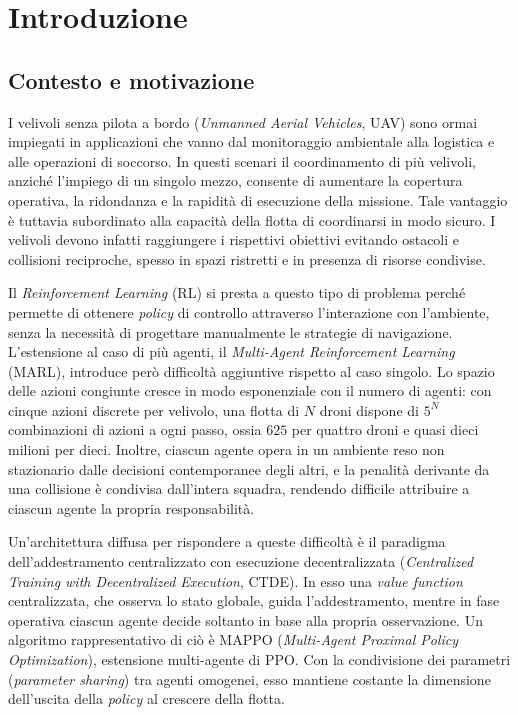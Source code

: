\documentclass[12pt,a4paper,twoside]{report}
\newcommand{\paginabianca}{\clearpage\null\thispagestyle{empty}\clearpage}
\begin{document}

\paginabianca

\tableofcontents
\clearpage

\chapter{Introduzione}
\label{chap:introduzione}

\section{Contesto e motivazione}
\label{sec:contesto_motivazione}

I velivoli senza pilota a bordo (\emph{Unmanned Aerial Vehicles}, UAV) sono ormai impiegati in applicazioni che vanno dal monitoraggio ambientale alla logistica e alle operazioni di soccorso. In questi scenari il coordinamento di più velivoli, anziché l'impiego di un singolo mezzo, consente di aumentare la copertura operativa, la ridondanza e la rapidità di esecuzione della missione. Tale vantaggio è tuttavia subordinato alla capacità della flotta di coordinarsi in modo sicuro. I velivoli devono infatti raggiungere i rispettivi obiettivi evitando ostacoli e collisioni reciproche, spesso in spazi ristretti e in presenza di risorse condivise.

Il \emph{Reinforcement Learning} (RL) si presta a questo tipo di problema perché permette di ottenere \emph{policy} di controllo attraverso l'interazione con l'ambiente, senza la necessità di progettare manualmente le strategie di navigazione. L'estensione al caso di più agenti, il \emph{Multi-Agent Reinforcement Learning} (MARL), introduce però difficoltà aggiuntive rispetto al caso singolo. Lo spazio delle azioni congiunte cresce in modo esponenziale con il numero di agenti: con cinque azioni discrete per velivolo, una flotta di $N$ droni dispone di $5^N$ combinazioni di azioni a ogni passo, ossia $625$ per quattro droni e quasi dieci milioni per dieci. Inoltre, ciascun agente opera in un ambiente reso non stazionario dalle decisioni contemporanee degli altri, e la penalità derivante da una collisione è condivisa dall'intera squadra, rendendo difficile attribuire a ciascun agente la propria responsabilità.

Un'architettura diffusa per rispondere a queste difficoltà è il paradigma dell'addestramento centralizzato con esecuzione decentralizzata (\emph{Centralized Training with Decentralized Execution}, CTDE). In esso una \emph{value function} centralizzata, che osserva lo stato globale, guida l'addestramento, mentre in fase operativa ciascun agente decide soltanto in base alla propria osservazione. Un algoritmo rappresentativo di ciò è MAPPO (\emph{Multi-Agent Proximal Policy Optimization}), estensione multi-agente di PPO. Con la condivisione dei parametri (\emph{parameter sharing}) tra agenti omogenei, esso mantiene costante la dimensione dell'uscita della \emph{policy} al crescere della flotta.
\end{document}
